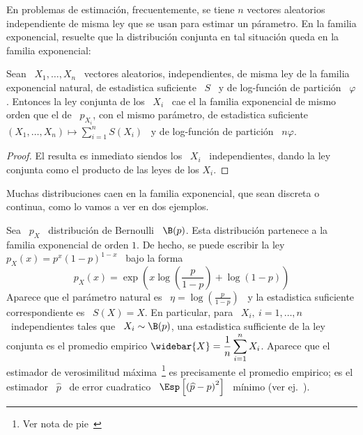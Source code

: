En problemas  de estimaci\'on, frecuentemente, se tiene  $n$ vectores aleatorios
independiente  de misma  ley que  se  usan para  estimar un  p\'arametro. En  la
familia exponencial, resuelte que  la distribuci\'on conjunta en tal situaci\'on
queda en la familia exponencial:
%
\begin{lema}
  Sean \  $X_1 , \ldots ,  X_n$ \ vectores aleatorios,  independientes, de misma
  ley de la familia exponencial natural,  de estadistica suficiente \ $S$ \ y de
  log-funci\'on de  partici\'on \ $\varphi$. Entonces  la ley conjunta  de los \
  $X_i$ \ cae  el la familia exponencial  de mismo orden que el  de \ $p_{X_i}$,
  con  el   mismo  par\'ametro,  de  estadistica   suficiente  \  $\displaystyle
  (X_1,\ldots,X_n)  \mapsto  \sum_{i=1}^n  S(X_i)$   \  y  de  log-funci\'on  de
  partici\'on \ $n \varphi$.
\end{lema}
%
\begin{proof}
  El resulta  es inmediato siendos  los \ $X_i$  \ independientes, dando  la ley
  conjunta como el producto de las leyes de los $X_i$.
\end{proof}

Muchas  distribuciones caen  en  la  familia exponencial,  que  sean discreta  o
continua, como lo vamos a ver en dos ejemplos.
%
\begin{ejemplo}
  Sea  \ $p_X$  \ distribuci\'on  de Bernoulli  \ $\B(p)$.   Esta distribuci\'on
  partenece a la familia exponencial de  orden $1$.  De hecho, se puede escribir
  la ley \ $p_X(x) = p^x (1-p)^{1-x}$ \ bajo la forma
  \[
  p_X(x) = \exp\left( x \log \left( \frac{p}{1-p} \right) + \log(1-p) \right)
  \]
  Aparece  que el par\'ametro  natural es  \ $\eta  = \log  \left( \frac{p}{1-p}
  \right)$ \  y la estadistica  suficiente correspondiente es  \ $S(X) =  X$. En
  particular, para \  $X_i, \: i = 1,  \ldots , n$ \ independientes  tales que \
  $X_i  \sim  \B(p)$, una  estadistica  sufficiente de  la  ley  conjunta es  el
  promedio empirico $\displaystyle  \widebar{X} = \frac{1}{n} \sum_{i=1}^n X_i$.
  Aparece  que  el estimador  de  verosimilitud  m\'axima~\footnote{Ver nota  de
    pie~\footref{Foot:MP:MLE}}  es  precisamente  el  promedio empirico;  es  el
  estimador  \  $\widehat{p}$  \   de  error  cuadratico  \  $\Esp\left[  \left(
      \widehat{p} - p \right)^2 \right]$ \ m\'inimo (ver ej.~\cite{Kay93}).
\end{ejemplo}

